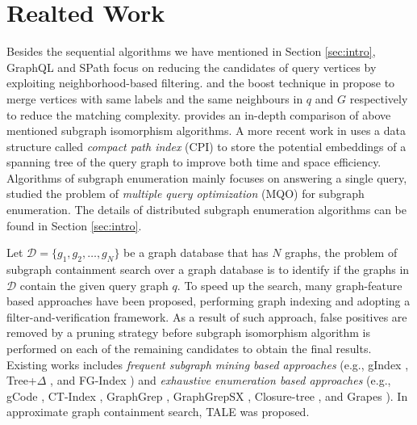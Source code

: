\section{Realted Work}
\label{sec:rel}

  Besides the sequential algorithms we have mentioned in Section \ref{sec:intro}, GraphQL \cite{graph-ql} and SPath \cite{spath} focus on reducing the candidates of query vertices by exploiting neighborhood-based filtering. \turboiso \cite{turbo-iso} and the boost technique in \cite{subgraph-boost} propose to merge vertices with same labels and the same neighbours in $q$ and $G$ respectively to reduce the matching complexity. \cite{comparison} provides an in-depth comparison of above mentioned subgraph isomorphism algorithms. A more recent work in \cite{bi-fei} uses a data structure called \textit{compact path index} (CPI) to store the potential embeddings of a spanning tree of the query graph to improve both time and space efficiency. Algorithms of subgraph enumeration mainly focuses on answering a single query, \cite{multi-query} studied the problem of \textit{multiple query optimization} (MQO) for subgraph enumeration. The details of distributed subgraph enumeration algorithms can be found in Section \ref{sec:intro}.

 Let $\mathcal{D}=\{g_1,g_2,\dots,g_N\}$ be a graph database that has $N$ graphs, the problem of subgraph containment search over a graph database is to identify if the graphs in $\mathcal{D}$ contain the given query graph $q$. To speed up the search, many graph-feature based approaches have been proposed, performing graph indexing and adopting a filter-and-verification framework. As a result of such approach, false positives are removed by a pruning strategy before subgraph isomorphism algorithm is performed on each of the remaining candidates to obtain the final results. Existing works includes \textit{frequent subgraph mining based approaches} (e.g., gIndex \cite{gindex}, Tree+$\Delta$ \cite{tree+}, and FG-Index \cite{fg-index}) and \textit{exhaustive enumeration based approaches} (e.g., gCode \cite{gcode}, CT-Index \cite{ct-index}, GraphGrep \cite{graph-grep}, GraphGrepSX \cite{graph-grep-sx}, Closure-tree \cite{closure-tree}, and Grapes \cite{grapes}). In approximate graph containment search, TALE \cite{tale} was proposed.